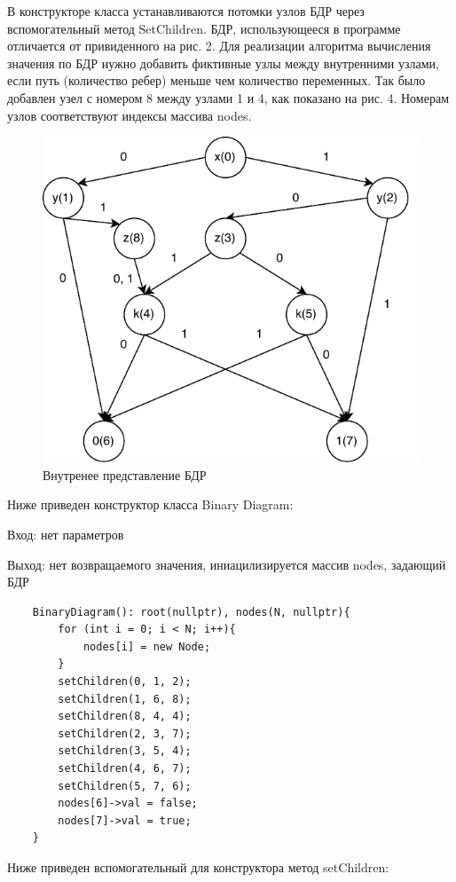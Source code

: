 \documentclass[a4paper]{article}
\theoremstyle{plain}
\theoremstyle{definition*}
\theoremstyle{remark}
\begin{document}
В конструкторе класса устанавливаются потомки узлов БДР через 
вспомогательный метод SetChildren. БДР, использующееся в программе 
отличается от привиденного на рис. 2. Для реализации алгоритма вычисления
значения по БДР нужно добавить фиктивные узлы между внутренними узлами,
если путь (количество ребер) меньше чем количество переменных. Так 
было добавлен узел с номером 8 между узлами 1 и 4, как показано 
на рис. 4. Номерам узлов соответствуют индексы массива nodes. 

\begin{figure}[htpb]
    \centering
    \includegraphics[scale = 0.7]{pics/BDR-3.pdf}
    \caption{Внутренее представление БДР}
    \label{fig:BDR-3-pdf}
\end{figure}

Ниже приведен конструктор класса Binary Diagram:


Вход: нет параметров


Выход: нет возвращаемого значения, иниацилизируется массив 
nodes, задающий БДР
\begin{lstlisting}
    BinaryDiagram(): root(nullptr), nodes(N, nullptr){
        for (int i = 0; i < N; i++){
            nodes[i] = new Node;
        }
        setChildren(0, 1, 2);
        setChildren(1, 6, 8);
        setChildren(8, 4, 4);
        setChildren(2, 3, 7);
        setChildren(3, 5, 4);
        setChildren(4, 6, 7);
        setChildren(5, 7, 6);
        nodes[6]->val = false;
        nodes[7]->val = true;
    }
\end{lstlisting}
Ниже приведен вспомогательный для конструктора метод setChildren:
\end{document}
